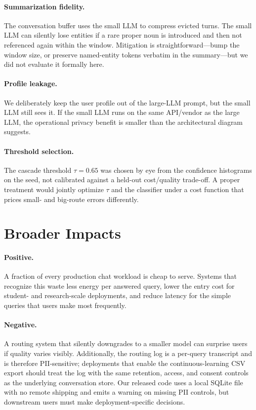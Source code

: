 \documentclass{article}
\begin{document}
\paragraph{Summarization fidelity.} The conversation buffer uses the small
LLM to compress evicted turns. The small LLM can silently lose entities if a
rare proper noun is introduced and then not referenced again within the
window. Mitigation is straightforward---bump the window size, or preserve
named-entity tokens verbatim in the summary---but we did not evaluate it
formally here.

\paragraph{Profile leakage.} We deliberately keep the user profile out of the
large-LLM prompt, but the small LLM still sees it. If the small LLM runs on
the same API/vendor as the large LLM, the operational privacy benefit is
smaller than the architectural diagram suggests.

\paragraph{Threshold selection.} The cascade threshold $\tau = 0.65$ was
chosen by eye from the confidence histograms on the seed, not calibrated
against a held-out cost/quality trade-off. A proper treatment would jointly
optimize $\tau$ and the classifier under a cost function that prices small-
and big-route errors differently.

\section{Broader Impacts}
\label{sec:impacts}

\paragraph{Positive.} A fraction of every production chat workload is cheap
to serve. Systems that recognize this waste less energy per answered query,
lower the entry cost for student- and research-scale deployments, and
reduce latency for the simple queries that users make most frequently.

\paragraph{Negative.} A routing system that silently downgrades to a smaller
model can surprise users if quality varies visibly. Additionally, the
routing log is a per-query transcript and is therefore PII-sensitive;
deployments that enable the continuous-learning CSV export should treat the
log with the same retention, access, and consent controls as the underlying
conversation store. Our released code uses a local SQLite file with no
remote shipping and emits a warning on missing PII controls, but downstream
users must make deployment-specific decisions.
\end{document}
